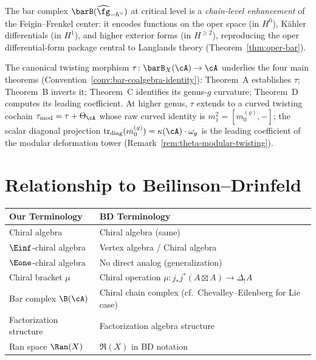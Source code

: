 \begin{remark}%
\label{rem:oper-langlands-concordance}
%
%
The bar complex
$\barB(\widehat{\fg}_{-h^\vee})$ at critical level is a
\emph{chain-level enhancement} of the Feigin--Frenkel center:
it encodes functions on the oper space (in $H^0$),
K\"ahler differentials (in $H^1$), and higher exterior forms
(in $H^{\geq 2}$), reproducing the oper differential-form
package central to Langlands theory
(Theorem~\ref{thm:oper-bar}).
\end{remark}

\begin{remark}
\label{rem:tau-protagonist}
The canonical twisting morphism $\tau \colon \barB_X(\cA) \to \cA$
underlies the four main theorems
(Convention~\ref{conv:bar-coalgebra-identity}):
Theorem~A establishes $\tau$; Theorem~B inverts it;
Theorem~C identifies its genus-$g$ curvature; Theorem~D computes
its leading coefficient.
At higher genus, $\tau$ extends to a curved twisting cochain
$\tau_{\mathrm{mod}} = \tau + \Theta_\cA$
whose raw curved identity is $m_1^2=[m_0^{(g)},-]$; the scalar
diagonal projection
$\operatorname{tr}_{\mathrm{diag}}(m_0^{(g)})
=\kappa(\cA)\cdot\omega_g$ is the leading coefficient of the modular
deformation tower
(Remark~\ref{rem:theta-modular-twisting}).
\end{remark}

\section{Relationship to Beilinson--Drinfeld}

\begin{tabular}{>{\raggedright\arraybackslash}p{}>{\raggedright\arraybackslash}p{}}
\textbf{Our Terminology} & \textbf{BD Terminology} \\
\hline
Chiral algebra & Chiral algebra (same) \\
$\Einf$-chiral algebra & Vertex algebra / Chiral algebra \\
$\Eone$-chiral algebra & No direct analog (generalization) \\
Chiral bracket $\mu$ & Chiral operation $\mu: j_* j^*(A \boxtimes A) \to \Delta_! A$ \\
Bar complex $\B(\cA)$ & Chiral chain complex (cf.\ Chevalley--Eilenberg for Lie case) \\
Factorization structure & Factorization algebra structure \\
Ran space $\Ran(X)$ & $\mathfrak{R}(X)$ in BD notation \\
\end{tabular}

